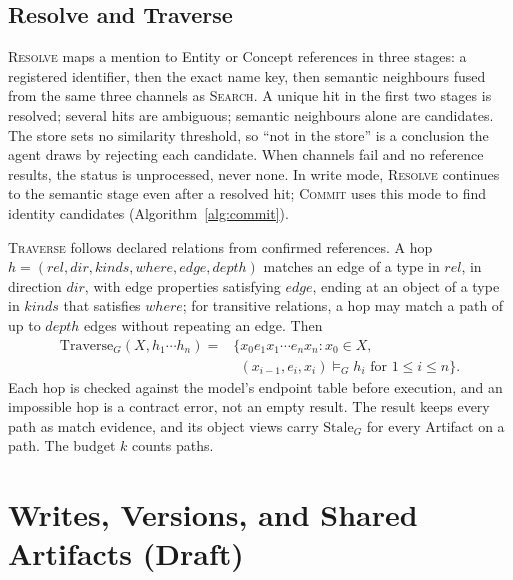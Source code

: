 \documentclass[sigconf,review,anonymous]{acmart}
\begin{document}
\subsection{Resolve and Traverse}
\label{sec:resolve-traverse-draft}

\textsc{Resolve} maps a mention to Entity or Concept references in three
stages: a registered identifier, then the exact name key, then semantic
neighbours fused from the same three channels as \textsc{Search}. A unique hit
in the first two stages is \textsf{resolved}; several hits are
\textsf{ambiguous}; semantic neighbours alone are \textsf{candidates}. The
store sets no similarity threshold, so ``not in the store'' is a conclusion the
agent draws by rejecting each candidate. When channels fail and no reference
results, the status is \textsf{unprocessed}, never \textsf{none}. In write mode,
\textsc{Resolve} continues to the semantic stage even after a resolved hit;
\textsc{Commit} uses this mode to find identity candidates
(Algorithm~\ref{alg:commit}).

\textsc{Traverse} follows declared relations from confirmed references. A hop
$h=(\mathit{rel},\mathit{dir},\mathit{kinds},\mathit{where},\mathit{edge},
\mathit{depth})$ matches an edge of a type in $\mathit{rel}$, in direction
$\mathit{dir}$, with edge properties satisfying $\mathit{edge}$, ending at an
object of a type in $\mathit{kinds}$ that satisfies $\mathit{where}$; for
transitive relations, a hop may match a path of up to $\mathit{depth}$ edges
without repeating an edge. Then
\begin{equation}
\label{eq:traverse}
\begin{aligned}
\mathrm{Traverse}_G(X, h_1\cdots h_n)={}
  &\{x_0 e_1 x_1\cdots e_n x_n : x_0\in X,\\
  &\ \ (x_{i-1},e_i,x_i)\models_G h_i \text{ for } 1\le i\le n\}.
\end{aligned}
\end{equation}
Each hop is checked against the model's endpoint table before execution, and
an impossible hop is a contract error, not an empty result. The result keeps
every path as match evidence, and its object views carry
$\mathrm{Stale}_G$ for every Artifact on a path. The budget $k$ counts paths.

\section{Writes, Versions, and Shared Artifacts (Draft)}
\label{sec:versions-draft}
\end{document}
